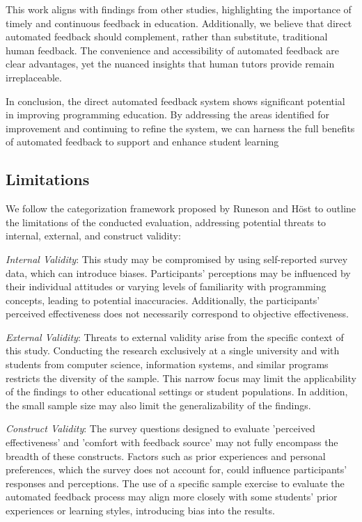 \documentclass[manuscript,screen,review]{acmart}
\begin{document}
This work aligns with findings from other studies, highlighting the importance of timely and continuous feedback in education.
Additionally, we believe that direct automated feedback should complement, rather than substitute, traditional human feedback.
The convenience and accessibility of automated feedback are clear advantages, yet the nuanced insights that human tutors provide remain irreplaceable.

In conclusion, the direct automated feedback system shows significant potential in improving programming education.
By addressing the areas identified for improvement and continuing to refine the system, we can harness the full benefits of automated feedback to support and enhance student learning


\subsection{Limitations}
We follow the categorization framework proposed by Runeson and Höst \cite{runeson:2009:GuidelinesConductingReporting} to outline the limitations of the conducted evaluation, addressing potential threats to internal, external, and construct validity:

\textit{Internal Validity}: This study may be compromised by using self-reported survey data, which can introduce biases. 
Participants' perceptions may be influenced by their individual attitudes or varying levels of familiarity with programming concepts, leading to potential inaccuracies.
Additionally, the participants' perceived effectiveness does not necessarily correspond to objective effectiveness.

\textit{External Validity}: Threats to external validity arise from the specific context of this study. 
Conducting the research exclusively at a single university and with students from computer science, information systems, and similar programs restricts the diversity of the sample. 
This narrow focus may limit the applicability of the findings to other educational settings or student populations. 
In addition, the small sample size may also limit the generalizability of the findings.

\textit{Construct Validity}: 
The survey questions designed to evaluate 'perceived effectiveness' and 'comfort with feedback source' may not fully encompass the breadth of these constructs.
Factors such as prior experiences and personal preferences, which the survey does not account for, could influence participants' responses and perceptions.
The use of a specific sample exercise to evaluate the automated feedback process may align more closely with some students' prior experiences or learning styles, introducing bias into the results.
\end{document}
